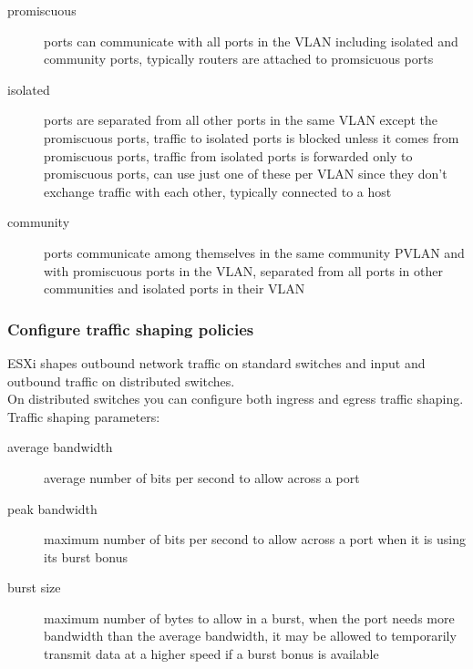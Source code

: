 \begin{description}

\item[promiscuous]
ports can communicate with all ports in the VLAN including isolated and
community ports, typically routers are attached to promsicuous ports

\item[isolated]
ports are separated from all other ports in the same VLAN except the
promiscuous ports, traffic to isolated ports is blocked unless it comes from
promiscuous ports, traffic from isolated ports is forwarded only to
promiscuous ports, can use just one of these per VLAN since they don't
exchange traffic with each other, typically connected to a host

\item[community]
ports communicate among themselves in the same community PVLAN and with
promiscuous ports in the VLAN, separated from all ports in other communities
and isolated ports in their VLAN

\end{description}

\subsubsection{Configure traffic shaping policies}

ESXi shapes outbound network traffic on standard switches and input and
outbound traffic on distributed switches.\\

On distributed switches you can configure both ingress and egress traffic
shaping.\\

Traffic shaping parameters:

\begin{description}

\item[average bandwidth]
average number of bits per second to allow across a port

\item[peak bandwidth]
maximum number of bits per second to allow across a port when it is using
its burst bonus

\item[burst size]
maximum number of bytes to allow in a burst, when the port needs more
bandwidth than the average bandwidth, it may be allowed to temporarily
transmit data at a higher speed if a burst bonus is available

\end{description}

